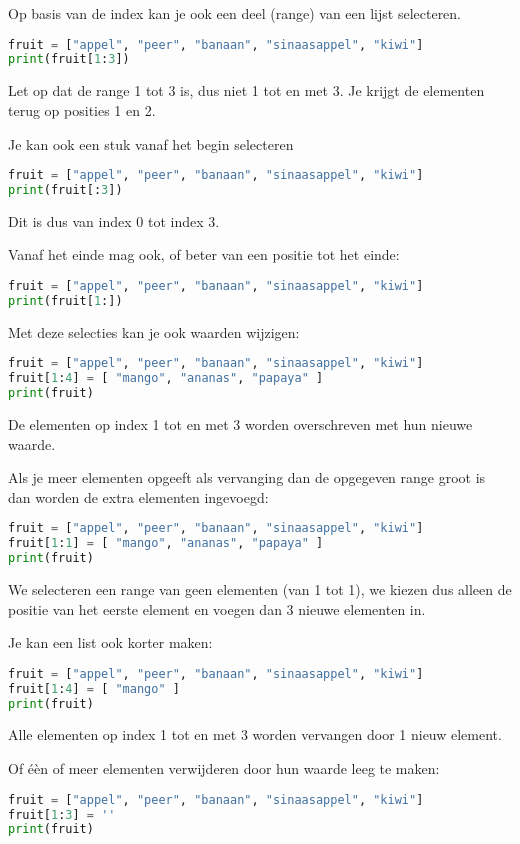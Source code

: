 Op basis van de index kan je ook een deel (range) van een lijst selecteren.
\begin{lstlisting}[language=python]
fruit = ["appel", "peer", "banaan", "sinaasappel", "kiwi"]
print(fruit[1:3])
\end{lstlisting}
Let op dat de range 1 tot 3 is, dus niet 1 tot en met 3. Je krijgt de elementen terug op posities 1 en 2.

Je kan ook een stuk vanaf het begin selecteren
\begin{lstlisting}[language=python]
fruit = ["appel", "peer", "banaan", "sinaasappel", "kiwi"]
print(fruit[:3])
\end{lstlisting}
Dit is dus van index 0 tot index 3.

Vanaf het einde mag ook, of beter van een positie tot het einde:
\begin{lstlisting}[language=python]
fruit = ["appel", "peer", "banaan", "sinaasappel", "kiwi"]
print(fruit[1:])
\end{lstlisting}

Met deze selecties kan je ook waarden wijzigen:
\begin{lstlisting}[language=python]
fruit = ["appel", "peer", "banaan", "sinaasappel", "kiwi"]
fruit[1:4] = [ "mango", "ananas", "papaya" ]
print(fruit)
\end{lstlisting}
De elementen op index 1 tot en met 3 worden overschreven met hun nieuwe waarde.

Als je meer elementen opgeeft als vervanging dan de opgegeven range groot is dan worden de extra elementen ingevoegd:
\begin{lstlisting}[language=python]
fruit = ["appel", "peer", "banaan", "sinaasappel", "kiwi"]
fruit[1:1] = [ "mango", "ananas", "papaya" ]
print(fruit)
\end{lstlisting}
We selecteren een range van geen elementen (van 1 tot 1), we kiezen dus alleen de positie van het eerste element en voegen dan 3 nieuwe elementen in.

Je kan een list ook korter maken:
\begin{lstlisting}[language=python]
fruit = ["appel", "peer", "banaan", "sinaasappel", "kiwi"]
fruit[1:4] = [ "mango" ]
print(fruit)
\end{lstlisting}
Alle elementen op index 1 tot en met 3 worden vervangen door 1 nieuw element.

Of \'e\`en of meer elementen verwijderen door hun waarde leeg te maken:
\begin{lstlisting}[language=python]
fruit = ["appel", "peer", "banaan", "sinaasappel", "kiwi"]
fruit[1:3] = ''
print(fruit)
\end{lstlisting}

